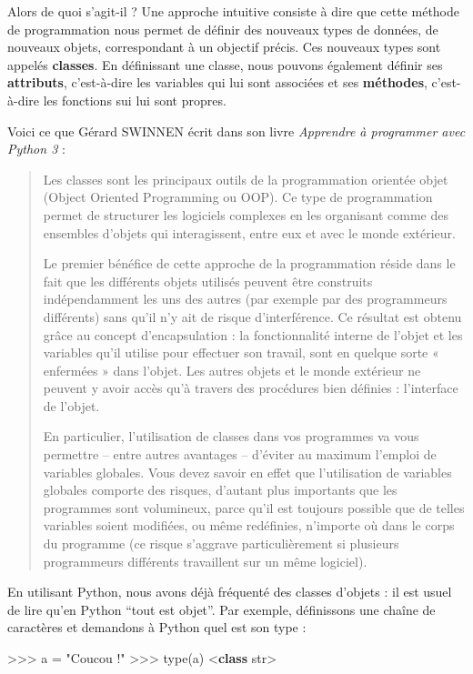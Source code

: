 \documentclass[
  french,
  letterpaper,
  DIV=11,
  numbers=noendperiod]{scrartcl}
\newenvironment{Shaded}{\begin{snugshade}}{\end{snugshade}}
\newcommand{\BuiltInTok}[1]{\textcolor[rgb]{0.00,0.23,0.31}{#1}}
\newcommand{\KeywordTok}[1]{\textcolor[rgb]{0.00,0.23,0.31}{\textbf{#1}}}
\newcommand{\NormalTok}[1]{\textcolor[rgb]{0.00,0.23,0.31}{#1}}
\newcommand{\OperatorTok}[1]{\textcolor[rgb]{0.37,0.37,0.37}{#1}}
\newcommand{\StringTok}[1]{\textcolor[rgb]{0.13,0.47,0.30}{#1}}
\begin{document}
Alors de quoi s'agit-il ? Une approche intuitive consiste à dire que
cette méthode de programmation nous permet de définir des nouveaux types
de données, de nouveaux objets, correspondant à un objectif précis. Ces
nouveaux types sont appelés \textbf{classes}. En définissant une classe,
nous pouvons également définir ses \textbf{attributs}, c'est-à-dire les
variables qui lui sont associées et ses \textbf{méthodes}, c'est-à-dire
les fonctions sui lui sont propres.

Voici ce que Gérard SWINNEN écrit dans son livre \emph{Apprendre à
programmer avec Python 3} :

\begin{quote}
Les classes sont les principaux outils de la programmation orientée
objet (Object Oriented Programming ou OOP). Ce type de programmation
permet de structurer les logiciels complexes en les organisant comme des
ensembles d'objets qui interagissent, entre eux et avec le monde
extérieur.

Le premier bénéfice de cette approche de la programmation réside dans le
fait que les différents objets utilisés peuvent être construits
indépendamment les uns des autres (par exemple par des programmeurs
différents) sans qu'il n'y ait de risque d'interférence. Ce résultat est
obtenu grâce au concept d'encapsulation : la fonctionnalité interne de
l'objet et les variables qu'il utilise pour effectuer son travail, sont
en quelque sorte « enfermées » dans l'objet. Les autres objets et le
monde extérieur ne peuvent y avoir accès qu'à travers des procédures
bien définies : l'interface de l'objet.

En particulier, l'utilisation de classes dans vos programmes va vous
permettre -- entre autres avantages -- d'éviter au maximum l'emploi de
variables globales. Vous devez savoir en effet que l'utilisation de
variables globales comporte des risques, d'autant plus importants que
les programmes sont volumineux, parce qu'il est toujours possible que de
telles variables soient modifiées, ou même redéfinies, n'importe où dans
le corps du programme (ce risque s'aggrave particulièrement si plusieurs
programmeurs différents travaillent sur un même logiciel).
\end{quote}

En utilisant Python, nous avons déjà fréquenté des classes d'objets : il
est usuel de lire qu'en Python ``tout est objet''. Par exemple,
définissons une chaîne de caractères et demandons à Python quel est son
type :

\begin{Shaded}
\begin{Highlighting}[]
\OperatorTok{\textgreater{}\textgreater{}\textgreater{}}\NormalTok{ a }\OperatorTok{=} \StringTok{"Coucou !"}
\OperatorTok{\textgreater{}\textgreater{}\textgreater{}} \BuiltInTok{type}\NormalTok{(a)}
\OperatorTok{\textless{}}\KeywordTok{class} \StringTok{\textquotesingle{}str\textquotesingle{}}\OperatorTok{\textgreater{}}
\end{Highlighting}
\end{Shaded}
\end{document}
